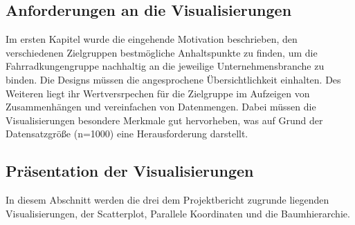 \documentclass[usegeometry=true]{scrartcl}
\begin{document}
\subsection{Anforderungen an die Visualisierungen}
Im ersten Kapitel wurde die eingehende Motivation beschrieben, den verschiedenen Zielgruppen bestmögliche Anhaltspunkte zu finden, um die Fahrradkungengruppe nachhaltig an die jeweilige Unternehmensbranche zu binden. Die Designs müssen die angesprochene Übersichtlichkeit einhalten. Des Weiteren liegt ihr Wertversrpechen für die Zielgruppe im Aufzeigen von Zusammenhängen und vereinfachen von Datenmengen. Dabei müssen die Visualisierungen besondere Merkmale gut hervorheben, was auf Grund der Datensatzgröße (n=1000) eine Herausforderung darstellt. 
\subsection{Präsentation der Visualisierungen}
In diesem Abschnitt werden die drei dem Projektbericht zugrunde liegenden Visualisierungen, der Scatterplot, Parallele Koordinaten und die Baumhierarchie. 
\end{document}
